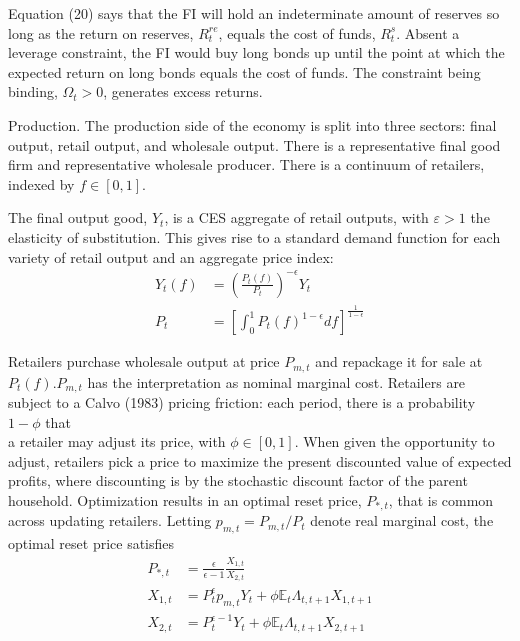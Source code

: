 \documentclass[10pt]{article}
\begin{document}
Equation (20) says that the FI will hold an indeterminate amount of reserves so long as the return on reserves, $R_{t}^{r e}$, equals the cost of funds, $R_{t}^{s}$. Absent a leverage constraint, the FI would buy long bonds up until the point at which the expected return on long bonds equals the cost of funds. The constraint being binding, $\Omega_{t}>0$, generates excess returns.

Production. The production side of the economy is split into three sectors: final output, retail output, and wholesale output. There is a representative final good firm and representative wholesale producer. There is a continuum of retailers, indexed by $f \in[0,1]$.

The final output good, $Y_{t}$, is a CES aggregate of retail outputs, with $\varepsilon>1$ the elasticity of substitution. This gives rise to a standard demand function for each variety of retail output and an aggregate price index:\\
\begin{align*}
Y_{t}(f) & =\left(\frac{P_{t}(f)}{P_{t}}\right)^{-\epsilon} Y_{t}  \tag{21}\\
P_{t} & =\left[\int_{0}^{1} P_{t}(f)^{1-\epsilon} d f\right]^{\frac{1}{1-\epsilon}} \tag{22}
\end{align*}

Retailers purchase wholesale output at price $P_{m, t}$ and repackage it for sale at $P_{t}(f) . P_{m, t}$ has the interpretation as nominal marginal cost. Retailers are subject to a Calvo (1983) pricing friction: each period, there is a probability $1-\phi$ that\\
a retailer may adjust its price, with $\phi \in[0,1]$. When given the opportunity to adjust, retailers pick a price to maximize the present discounted value of expected profits, where discounting is by the stochastic discount factor of the parent household. Optimization results in an optimal reset price, $P_{*, t}$, that is common across updating retailers. Letting $p_{m, t}=P_{m, t} / P_{t}$ denote real marginal cost, the optimal reset price satisfies\\
\begin{align*}
P_{*, t} & =\frac{\epsilon}{\epsilon-1} \frac{X_{1, t}}{X_{2, t}}  \tag{23}\\
X_{1, t} & =P_{t}^{\epsilon} p_{m, t} Y_{t}+\phi \mathbb{E}_{t} \Lambda_{t, t+1} X_{1, t+1}  \tag{24}\\
X_{2, t} & =P_{t}^{\epsilon-1} Y_{t}+\phi \mathbb{E}_{t} \Lambda_{t, t+1} X_{2, t+1} \tag{25}
\end{align*}
\end{document}
